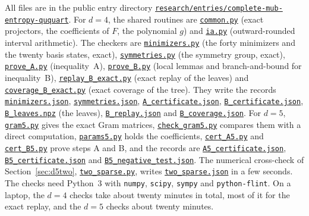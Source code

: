 \documentclass[11pt,a4paper]{article}
\theoremstyle{plain}
\newcommand{\repo}{https://github.com/jpbruneton/open_quantum_problems/blob/main/research/entries/complete-mub-entropy-ququart}
\begin{document}
All files are in the public entry directory
\href{https://github.com/jpbruneton/open_quantum_problems/tree/main/research/entries/complete-mub-entropy-ququart}{\texttt{research/entries/complete-mub-entropy-ququart}}.
For $d=4$, the shared routines are
\href{\repo/checks/common.py}{\texttt{common.py}} (exact projectors, the
coefficients of $F$, the polynomial $g$) and
\href{\repo/checks/ia.py}{\texttt{ia.py}} (outward-rounded interval
arithmetic). The checkers are
\href{\repo/checks/minimizers.py}{\texttt{minimizers.py}} (the forty minimizers
and the twenty basis states, exact),
\href{\repo/checks/symmetries.py}{\texttt{symmetries.py}} (the symmetry group,
exact), \href{\repo/checks/prove_A.py}{\texttt{prove\_A.py}} (inequality~A),
\href{\repo/checks/prove_B.py}{\texttt{prove\_B.py}} (local lemmas and
branch-and-bound for inequality~B),
\href{\repo/checks/replay_B_exact.py}{\texttt{replay\_B\_exact.py}} (exact
replay of the leaves) and
\href{\repo/checks/coverage_B_exact.py}{\texttt{coverage\_B\_exact.py}} (exact
coverage of the tree). They write the records
\href{\repo/data/minimizers.json}{\texttt{minimizers.json}},
\href{\repo/data/symmetries.json}{\texttt{symmetries.json}},
\href{\repo/data/A_certificate.json}{\texttt{A\_certificate.json}},
\href{\repo/data/B_certificate.json}{\texttt{B\_certificate.json}},
\href{\repo/data/B_leaves.npz}{\texttt{B\_leaves.npz}} (the leaves),
\href{\repo/data/B_replay.json}{\texttt{B\_replay.json}} and
\href{\repo/data/B_coverage.json}{\texttt{B\_coverage.json}}.
For $d=5$, \href{\repo/checks/gram5.py}{\texttt{gram5.py}} gives the exact Gram
matrices, \href{\repo/checks/check_gram5.py}{\texttt{check\_gram5.py}} compares
them with a direct computation,
\href{\repo/checks/params5.py}{\texttt{params5.py}} holds the coefficients,
\href{\repo/checks/cert_A5.py}{\texttt{cert\_A5.py}} and
\href{\repo/checks/cert_B5.py}{\texttt{cert\_B5.py}} prove steps A and B, and
the records are
\href{\repo/data/A5_certificate.json}{\texttt{A5\_certificate.json}},
\href{\repo/data/B5_certificate.json}{\texttt{B5\_certificate.json}} and
\href{\repo/data/B5_negative_test.json}{\texttt{B5\_negative\_test.json}}.
The numerical cross-check of Section~\ref{sec:d5two},
\href{\repo/checks/two_sparse.py}{\texttt{two\_sparse.py}}, writes
\href{\repo/data/two_sparse.json}{\texttt{two\_sparse.json}} in a few seconds.
The checks need Python~3 with \texttt{numpy}, \texttt{scipy}, \texttt{sympy}
and \texttt{python-flint}. On a laptop, the $d=4$ checks take about twenty
minutes in total, most of it for the exact replay, and the $d=5$ checks about
twenty minutes.
\end{document}

